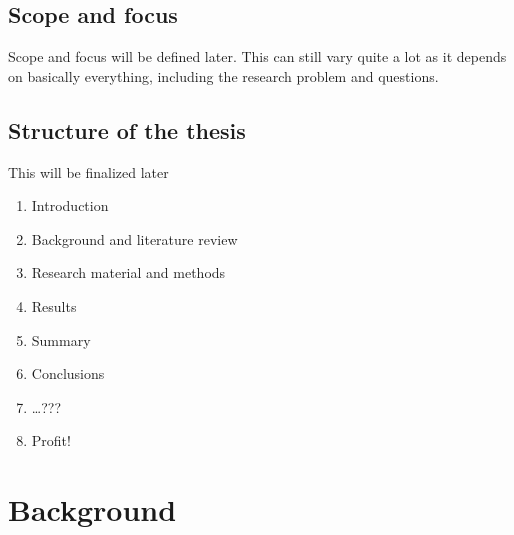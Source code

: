 \documentclass[english, 12pt, a4paper, sci, utf8, a-1b, online]{aaltothesis}
\begin{document}


\subsection{Scope and focus}
{
  \color{gray} Scope and focus will be defined later. This can still vary quite a lot as it depends on basically everything, including the research problem and questions.
}

\subsection{Structure of the thesis}
{
  \color{gray} This will be finalized later
}

\begin{enumerate}
  \item Introduction
  \item Background and literature review
  \item Research material and methods
  \item Results
  \item Summary
  \item Conclusions
  \item \dots ???
  \item Profit!
\end{enumerate}

\clearpage
\section{Background}


\end{document}
